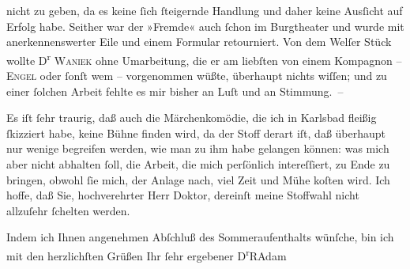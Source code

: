                nicht zu geben, da es keine{ }ſich{ }ſteigernde Handlung und daher keine Ausſicht auf
               Erfolg habe. Seither war der »Fremde« auch{ }ſchon
               im Burgtheater und wurde mit anerkennenswerter
               Eile und einem Formular retourniert. Von dem Welſer Stück wollte D\textsuperscript{r}{ }\textsc{Waniek} ohne Umarbeitung, die er am liebſten von einem Kompagnon – \textsc{Engel} oder{ }ſonſt wem – vorgenommen wüßte, überhaupt nichts wiſſen; und zu einer{ }ſolchen Arbeit fehlte es mir bisher an Luſt und an Stimmung. –\pend
           
\pstart
           Es iſt{ }ſehr traurig, daß auch die Märchenkomödie, die ich in Karlsbad fleißig{ }ſkizziert habe, keine Bühne finden wird, da der Stoff derart iſt, daß überhaupt nur
               wenige begreifen werden, wie man zu ihm habe gelangen können: was mich aber nicht
               abhalten{ }ſoll, die Arbeit, die mich perſönlich intereſſiert, {\pb}zu Ende zu bringen, obwohl{ }ſie mich, der
               Anlage nach, viel Zeit und Mühe koſten wird. Ich hoffe, daß Sie, hochverehrter Herr
               Doktor, dereinſt meine Stoffwahl nicht allzuſehr{ }ſchelten werden.\pend
           
\pstart
           Indem ich Ihnen angenehmen Abſchluß des Sommeraufenthalts wünſche, bin ich mit den
               herzlichſten Grüßen Ihr{ }ſehr ergebener\pend
           \pstart \spacefill\mbox{D\textsuperscript{r}RAdam}\pend{}\endnumbering{}  \newcommand{\dateiname}{L02325}\newcommand{\titel}{Robert Adam an Arthur Schnitzler, 19. 8. 1919}\newcommand{\editorInnen}{Martin Anton Müller und Gerd-Hermann Susen}

